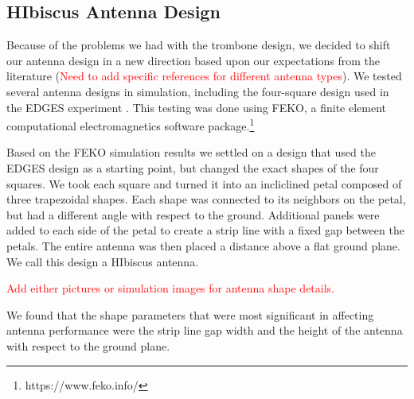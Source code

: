 \subsection{HIbiscus Antenna Design}

Because of the problems we had with the trombone design, we decided to shift our antenna design in a new direction based upon our expectations from the literature (\textcolor{red}{Need to add specific references for different antenna types}). We tested several antenna designs in simulation, including the four-square design used in the EDGES experiment \cite{rogers_2012}. This testing was done using FEKO, a finite element computational electromagnetics software package.\footnote{https://www.feko.info/}

Based on the FEKO simulation results we settled on a design that used the EDGES design as a starting point, but changed the exact shapes of the four squares. We took each square and turned it into an incliclined petal composed of three trapezoidal shapes. Each shape was connected to its neighbors on the petal, but had a different angle with respect to the ground. Additional panels were added to each side of the petal to create a strip line with a fixed gap between the petals. The entire antenna was then placed a distance above a flat ground plane. We call this design a HIbiscus antenna. 

\textcolor{red}{Add either pictures or simulation images for antenna shape details.}

We found that the shape parameters that were most significant in affecting antenna performance were the strip line gap width and the height of the antenna with respect to the ground plane. 

